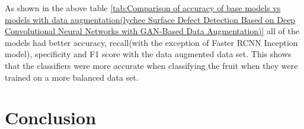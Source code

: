 \begin{table}[H]
    \centering
    \caption{Comparison of accuracy of base models vs models with data augmentation(lychee Surface Defect Detection Based on Deep Convolutional
Neural Networks with GAN-Based Data Augmentation)\cite{litReviewLychee}}
    \label{tab:Comparison of accuracy of base models vs models with data augmentation(lychee Surface Defect Detection Based on Deep Convolutional Neural Networks with GAN-Based Data Augmentation)}
\end{table}
As shown in the above table \ref{tab:Comparison of accuracy of base models vs models with data augmentation(lychee Surface Defect Detection Based on Deep Convolutional Neural Networks with GAN-Based Data Augmentation)} all of the models had better accuracy, recall(with the exception of Faster RCNN Inception model), specificity and F1 score with the data augmented data set.  This shows that the classifiers were more accurate when classifying the fruit when they were trained on a more balanced data set.
\section{Conclusion}

